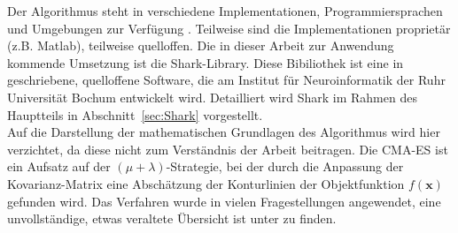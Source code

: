 %
Der Algorithmus steht in verschiedene Implementationen, Programmiersprachen und Umgebungen zur Verfügung \cite{HansenCode}. Teilweise sind die Implementationen proprietär (z.B. Matlab), teilweise quelloffen. Die in dieser Arbeit zur Anwendung kommende Umsetzung ist die Shark-Library. Diese Bibiliothek ist eine in \cpp  geschriebene, quelloffene Software, die am Institut für Neuroinformatik der Ruhr Universität Bochum entwickelt wird. Detailliert wird Shark im Rahmen des Hauptteils in Abschnitt~\ref{sec:Shark} vorgestellt.\\

Auf die Darstellung der mathematischen Grundlagen des Algorithmus wird hier verzichtet, da diese nicht zum Verständnis der Arbeit beitragen. Die CMA-ES ist ein Aufsatz auf der $(\mu+\lambda)$-Strategie, bei der durch die Anpassung der Kovarianz-Matrix eine Abschätzung der Konturlinien der Objektfunktion $f(\mathbf{x})$ gefunden wird. Das Verfahren wurde in vielen Fragestellungen angewendet, eine unvollständige, etwas veraltete Übersicht ist unter \cite{CMAESOverview} zu finden.
